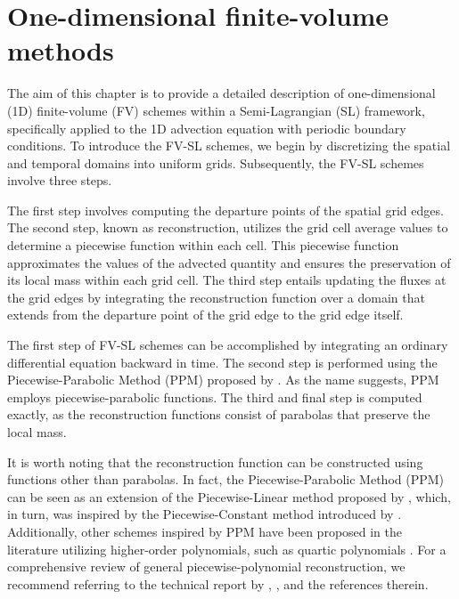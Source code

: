 \chapter{One-dimensional finite-volume methods}
\label{chp-1d-fv}

\theoremstyle{plain}
\newtheorem{lema}{Lemma}[chapter]

\theoremstyle{plain}
\newtheorem{prop}{Proposition}[chapter]

\theoremstyle{plain}
\newtheorem{thrm}{Theorem}[chapter]

\theoremstyle{plain}
\newtheorem{remark}{Remark}[chapter]

\theoremstyle{plain}
\newtheorem{corollary}{Corollary}[chapter]

\theoremstyle{plain}
\newtheorem{definition}{Definition}[chapter]

The aim of this chapter is to provide a detailed description of one-dimensional (1D)
finite-volume (FV) schemes within a Semi-Lagrangian (SL) framework, specifically applied
to the 1D advection equation with periodic boundary conditions. To introduce the FV-SL
schemes, we begin by discretizing the spatial and temporal domains into uniform grids.
Subsequently, the FV-SL schemes involve three steps.
    

The first step involves computing the departure points of the spatial grid edges.
The second step, known as reconstruction, utilizes the grid cell average values to
determine a piecewise function within each cell. This piecewise function approximates the
values of the advected quantity and ensures the preservation of its local mass within each grid cell.
The third step entails updating the fluxes at the grid edges by integrating the reconstruction
function over a domain that extends from the departure point of the grid edge to the grid edge itself.

The first step of FV-SL schemes can be accomplished by integrating an ordinary differential
equation backward in time.
The second step is performed using the Piecewise-Parabolic Method (PPM) proposed by \citet{colella:1984}.
As the name suggests, PPM employs piecewise-parabolic functions.
The third and final step is computed exactly, as the reconstruction functions consist of parabolas that preserve the local mass.

It is worth noting that the reconstruction function can be constructed using functions other than parabolas. In fact, the Piecewise-Parabolic Method (PPM) can be seen as an
extension of the Piecewise-Linear method proposed by \citet{vanleer:1977}, which,
in turn, was inspired by the Piecewise-Constant method introduced by \citet{godunov:1959}. 
Additionally, other schemes inspired by PPM have been proposed in the literature utilizing
higher-order polynomials, such as quartic polynomials \citep{white:2008}. For a
comprehensive review of general piecewise-polynomial reconstruction, we recommend
referring to the technical report by \citet{engwirda:2016}, \citet{lauritzen:2011}, and the
references therein.



